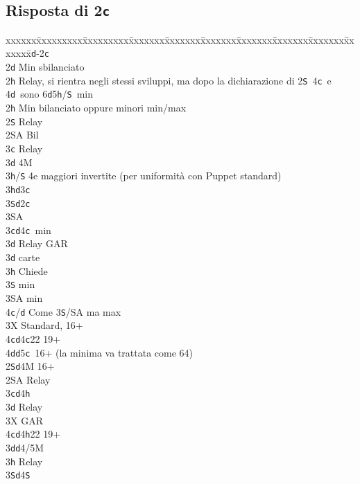 \documentclass[a4paper,italian]{article}
\newcommand{\BS}{\small{\texttt{S}}}
\newcommand{\BC}{\small{\texttt{c}}}
\newcommand{\BD}{\small{\texttt{d}}}
\newcommand{\BH}{\small{\texttt{h}}}
\newcommand{\pdfc}{\texorpdfstring{\texttt{c}}{C}}
\newenvironment{bidtable}
{\begin{tabbing}

    xxxxxx\=xxxxxxxxx\=xxxxxxxxx\=xxxxxxx\=xxxxxxx\=xxxxxxx\=xxxxxxx\=xxxxxxx\=xxxxxxx\=xxxxxxx\=\kill}
{\end{tabbing} }%
\begin{document}
\newpage

\subsection{Risposta di 2\pdfc}

\begin{bidtable}
    1\BD-2\BC\+\\
    2\BD \> Min sbilanciato\+\\
    2\BH \> Relay, si rientra negli stessi sviluppi, ma dopo la dichiarazione di 2\BS\ 4\BC\ e 4\BD\ sono 6\BD 5\BH /\BS\ min\-\\
    2\BH \> Min bilanciato oppure minori min/max\+\\
    2\BS \> Relay\+\\
    2\small{SA} \> Bil\+\\
    3\BC \> Relay\+\\
    3\BD \> 4M\+\\
    3\BH/\BS \> 4e maggiori invertite (per uniformità con Puppet standard)\-\\
    3\BH {}\BD 3\BC \\
    3\BS {}\BD 2\BC \\
    3\small{SA} \-\-\\
    3\BC {}\BD 4\BC\ min\+\\
    3\BD \> Relay GAR\-\\
    3\BD {} carte\+\\
    3\BH \> Chiede\+\\
    3\BS {} min\\
    3\small{SA}  min\\
    4\BC/\BD \> Come 3\BS /SA ma max\-\-\\
    3X \> Standard, 16+\\
    4\BC {}\BD 4\BC 22 19+\\
    4\BD {}\BD 5\BC\ 16+ (la minima va trattata come 64)\-\-\\
    2\BS {}\BD 4M 16+\+\\
    2\small{SA} \> Relay\+\\
    3\BC {}\BD 4\BH \+\\
    3\BD \> Relay\+\\
    3X \> GAR\\
    4\BC {}\BD 4\BH 22 19+\-\-\\
    3\BD {}\BD 4/5M\+\\
    3\BH \> Relay\+\\
    3\BS {}\BD 4\BS \\

\end{bidtable}
\end{document}
